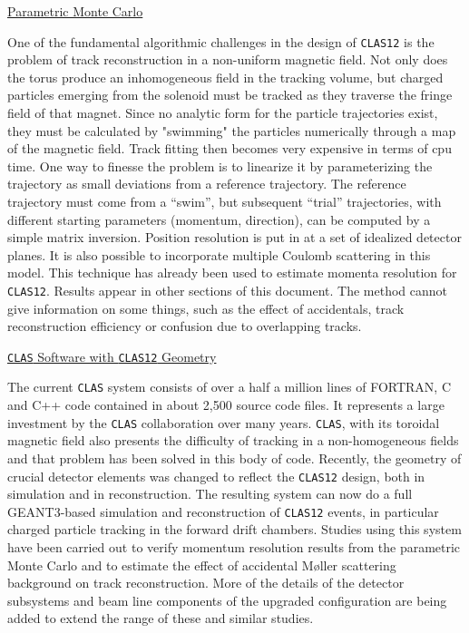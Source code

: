 \vskip 0.5cm

\noindent
\underline{Parametric Monte Carlo}

One of the fundamental algorithmic challenges in the design of {\tt CLAS12} 
is the problem of track reconstruction in a non-uniform magnetic field.  Not 
only does the torus produce an inhomogeneous field in the tracking volume, 
but charged particles emerging from the solenoid must be tracked as they 
traverse the fringe field of that magnet. Since no analytic form for the 
particle trajectories exist, they must be calculated by "swimming" the
particles numerically through a map of the magnetic field. Track fitting 
then becomes very expensive in terms of cpu time. One way to finesse the 
problem is to linearize it by parameterizing the trajectory as small deviations 
from a reference trajectory. The reference trajectory must come from a 
``swim'', but subsequent ``trial'' trajectories, with different starting 
parameters (momentum, direction), can be computed by a simple matrix 
inversion. Position resolution is put in at a set of idealized detector 
planes. It is also possible to incorporate multiple Coulomb scattering in 
this model. This technique has already been used to estimate momenta 
resolution for {\tt CLAS12}. Results appear in other sections of this 
document.  The method cannot give information on some things, such as the 
effect of accidentals, track reconstruction efficiency or confusion due to 
overlapping tracks.

\vskip 0.5cm

\noindent
\underline{{\tt CLAS} Software with {\tt CLAS12} Geometry}

The current {\tt CLAS} system consists of over a half a million lines of 
FORTRAN, C and C++ code contained in about 2,500 source code files. It 
represents a large investment by the {\tt CLAS} collaboration over many 
years. {\tt CLAS}, with its toroidal magnetic field also presents the 
difficulty of tracking in a non-homogeneous fields and that problem has 
been solved in this body of code. Recently, the geometry of crucial detector 
elements was changed to reflect the {\tt CLAS12} design, both in simulation 
and in reconstruction. The resulting system can now do a full GEANT3-based 
simulation and reconstruction of {\tt CLAS12} events, in particular charged 
particle tracking in the forward drift chambers. Studies using this system 
have been carried out to verify momentum resolution results from the 
parametric Monte Carlo and to estimate the effect of accidental M{\o}ller 
scattering background on track reconstruction. More of the details of the 
detector subsystems and beam line components of the upgraded configuration 
are being added to extend the range of these and similar studies.

